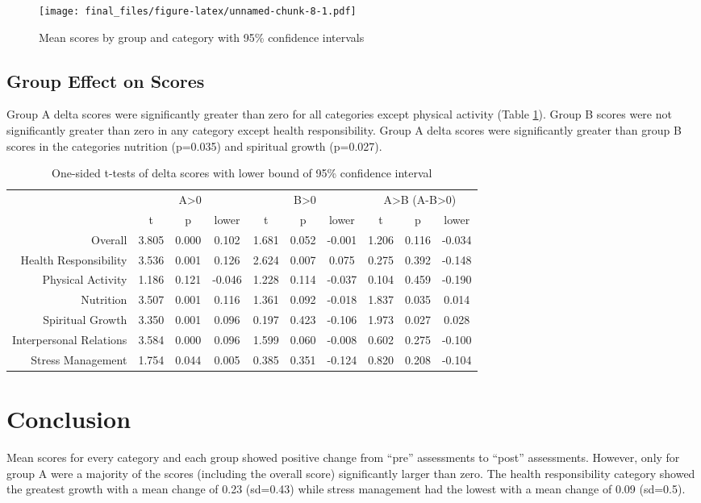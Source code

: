 \documentclass[]{article}
\begin{document}
\begin{figure} [hbt]
\caption{Mean scores by group and category with 95\% confidence intervals}
\texttt{[image: final\_files/figure-latex/unnamed-chunk-8-1.pdf]}
\label{fig:score}
\end{figure}

\subsection{Group Effect on Scores}\label{group-effect-on-scores}

Group A delta scores were significantly greater than zero for all
categories except physical activity (Table \ref{tab:tests}). Group B scores were not
significantly greater than zero in any category except health
responsibility. Group A delta scores were significantly greater than
group B scores in the categories nutrition (p=0.035) and spiritual
growth (p=0.027).

\begin{table}[hbt] \centering
\caption{One-sided t-tests of delta scores with lower
bound of 95\% confidence interval}

\begin{tabular}{r|ccccccccc}
& \multicolumn{3}{c}{A>0} & \multicolumn{3}{c}{B>0} & \multicolumn{3}{c}{A>B (A-B>0)}\\
  & t & p & lower & t & p & lower & t & p & lower \\ 
  \hline
Overall & 3.805 & 0.000 & 0.102 & 1.681 & 0.052 & -0.001 & 1.206 & 0.116 & -0.034 \\ 
  Health Responsibility & 3.536 & 0.001 & 0.126 & 2.624 & 0.007 & 0.075 & 0.275 & 0.392 & -0.148 \\ 
  Physical Activity & 1.186 & 0.121 & -0.046 & 1.228 & 0.114 & -0.037 & 0.104 & 0.459 & -0.190 \\ 
  Nutrition & 3.507 & 0.001 & 0.116 & 1.361 & 0.092 & -0.018 & 1.837 & 0.035 & 0.014 \\ 
  Spiritual Growth & 3.350 & 0.001 & 0.096 & 0.197 & 0.423 & -0.106 & 1.973 & 0.027 & 0.028 \\ 
  Interpersonal Relations & 3.584 & 0.000 & 0.096 & 1.599 & 0.060 & -0.008 & 0.602 & 0.275 & -0.100 \\ 
  Stress Management & 1.754 & 0.044 & 0.005 & 0.385 & 0.351 & -0.124 & 0.820 & 0.208 & -0.104 \\ 
  \end{tabular}

\label{tab:tests} 
\end{table}

\section{Conclusion}\label{conclusion}

Mean scores for every category and each group showed positive change
from ``pre'' assessments to ``post'' assessments. However, only for
group A were a majority of the scores (including the overall score)
significantly larger than zero. The health responsibility category
showed the greatest growth with a mean change of 0.23 (sd=0.43) while
stress management had the lowest with a mean change of 0.09 (sd=0.5).
\end{document}
